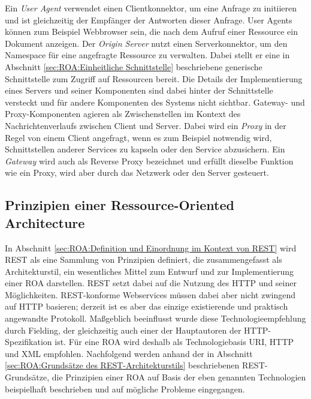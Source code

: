 Ein \emph{User Agent} verwendet einen Clientkonnektor, um eine Anfrage zu initiieren und ist gleichzeitig der Empfänger der Antworten dieser Anfrage. User Agents können zum Beispiel Webbrowser sein, die nach dem Aufruf einer Ressource ein Dokument anzeigen. Der \emph{Origin Server} nutzt einen Serverkonnektor, um den Namespace für eine angefragte Ressource zu verwalten. Dabei stellt er eine in Abschnitt \ref{sec:ROA:Einheitliche Schnittstelle} beschriebene generische Schnittstelle zum Zugriff auf Ressourcen bereit. Die Details der Implementierung eines Servers und seiner Komponenten sind dabei hinter der Schnittstelle versteckt und für andere Komponenten des Systems nicht sichtbar. Gateway- und Proxy-Komponenten agieren als Zwischenstellen im Kontext des Nachrichtenverlaufs zwischen Client und Server. Dabei wird ein \emph{Proxy} in der Regel von einem Client angefragt, wenn es zum Beispiel notwendig wird, Schnittstellen anderer Services zu kapseln oder den Service abzusichern. Ein \emph{Gateway} wird auch als Reverse Proxy bezeichnet und erfüllt dieselbe Funktion wie ein Proxy, wird aber durch das Netzwerk oder den Server gesteuert. \parencite[vgl.][97]{Fielding2000}

\subsection{Prinzipien einer Ressource-Oriented Architecture
}
\label{sec:ROA:Prinzipien einer Ressource-Oriented Architecture}

In Abschnitt \ref{sec:ROA:Definition und Einordnung im Kontext von REST} wird \ac{REST} als eine Sammlung von Prinzipien definiert, die zusammengefasst als Architekturstil, ein wesentliches Mittel zum Entwurf und zur Implementierung einer \ac{ROA} darstellen. \ac{REST} setzt dabei auf die Nutzung des \ac{HTTP} und seiner Möglichkeiten. REST-konforme Webservices müssen dabei aber nicht zwingend auf \ac{HTTP} basieren; derzeit ist es aber das einzige existierende und praktisch angewandte Protokoll. Maßgeblich beeinflusst wurde diese Technologieempfehlung durch Fielding, der gleichzeitig auch einer der Hauptautoren der HTTP-Spezifikation ist. Für eine \acl{ROA} wird deshalb als Technologiebasis \acs{URI}, \acs{HTTP} und \acs{XML} empfohlen. \parencite[vgl.][80]{Ruby2007} Nachfolgend werden anhand der in Abschnitt \ref{sec:ROA:Grundsätze des REST-Architekturstils} beschriebenen REST-Grundsätze, die Prinzipien einer ROA auf Basis der eben genannten Technologien beispielhaft beschrieben und auf mögliche Probleme eingegangen.

